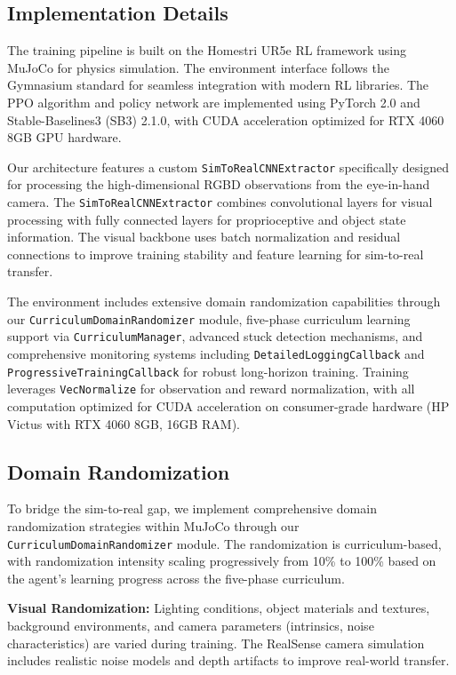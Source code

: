\documentclass[conference]{IEEEtran}
\begin{document}
\subsection{Implementation Details}
The training pipeline is built on the Homestri UR5e RL framework using MuJoCo for physics simulation. The environment interface follows the Gymnasium standard for seamless integration with modern RL libraries. The PPO algorithm and policy network are implemented using PyTorch 2.0 and Stable-Baselines3 (SB3) 2.1.0, with CUDA acceleration optimized for RTX 4060 8GB GPU hardware.

Our architecture features a custom \texttt{SimToRealCNNExtractor} specifically designed for processing the high-dimensional RGBD observations from the eye-in-hand camera. The \texttt{SimToRealCNNExtractor} combines convolutional layers for visual processing with fully connected layers for proprioceptive and object state information. The visual backbone uses batch normalization and residual connections to improve training stability and feature learning for sim-to-real transfer.

The environment includes extensive domain randomization capabilities through our \texttt{CurriculumDomainRandomizer} module, five-phase curriculum learning support via \texttt{CurriculumManager}, advanced stuck detection mechanisms, and comprehensive monitoring systems including \texttt{DetailedLoggingCallback} and \texttt{ProgressiveTrainingCallback} for robust long-horizon training. Training leverages \texttt{VecNormalize} for observation and reward normalization, with all computation optimized for CUDA acceleration on consumer-grade hardware (HP Victus with RTX 4060 8GB, 16GB RAM).

\subsection{Domain Randomization}
To bridge the sim-to-real gap, we implement comprehensive domain randomization strategies within MuJoCo through our \texttt{CurriculumDomainRandomizer} module. The randomization is curriculum-based, with randomization intensity scaling progressively from 10\% to 100\% based on the agent's learning progress across the five-phase curriculum.

\textbf{Visual Randomization:} Lighting conditions, object materials and textures, background environments, and camera parameters (intrinsics, noise characteristics) are varied during training. The RealSense camera simulation includes realistic noise models and depth artifacts to improve real-world transfer.
\end{document}
